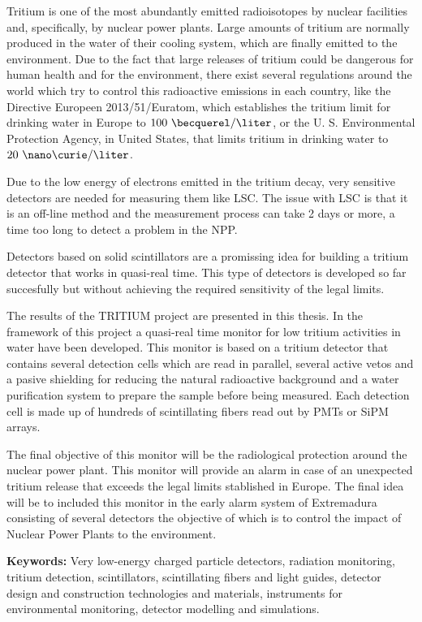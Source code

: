 Tritium is one of the most abundantly emitted radioisotopes by nuclear facilities and, specifically, by nuclear power plants. Large amounts of tritium are normally produced in the water of their cooling system, which are finally emitted to the environment. Due to the fact that large releases of tritium could be dangerous for human health and for the environment, there exist several regulations around the world which try to control this radioactive emissions in each country, like the Directive Europeen 2013/51/Euratom, which establishes the tritium limit for drinking water in Europe to $100~\becquerel/\liter$, or the U. S. Environmental Protection Agency, in United States, that limits tritium in drinking water to $20~\nano\curie/\liter$.

Due to the low energy of electrons emitted in the tritium decay, very sensitive detectors are needed for measuring them like LSC. The issue with LSC is that it is an off-line method and the measurement process can take 2 days or more, a time too long to detect a problem in the NPP.

Detectors based on solid scintillators are a promissing idea for building a tritium detector that works in quasi-real time. This type of detectors is developed so far succesfully but without achieving the required sensitivity of the legal limits.

The results of the TRITIUM project are presented in this thesis. In the framework of this project a quasi-real time monitor for low tritium activities in water have been developed. This monitor is based on a tritium detector that contains several detection cells which are read in parallel, several active vetos and a pasive shielding for reducing the natural radioactive background and a water purification system to prepare the sample before being measured. Each detection cell is made up of hundreds of scintillating fibers read out by PMTs or SiPM arrays.

The final objective of this monitor will be the radiological protection around the nuclear power plant. This monitor will provide an alarm in case of an unexpected tritium release that exceeds the legal limits stablished in Europe. The final idea will be to included this monitor in the early alarm system of Extremadura consisting of several detectors the objective of which is to control the impact of Nuclear Power Plants to the environment.

\vspace{1cm}

\textbf{Keywords:} Very low-energy charged particle detectors, radiation monitoring, tritium detection, scintillators, scintillating fibers and light guides, detector design and construction technologies and materials, instruments for environmental monitoring, detector modelling and simulations.

